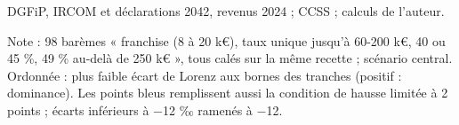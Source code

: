 DGFiP, IRCOM et déclarations 2042, revenus 2024 ; CCSS ; calculs de l'auteur.\par Note : 98 barèmes « franchise (8 à 20 k\euro{}), taux unique jusqu'à 60-200 k\euro{}, 40 ou 45 \%, 49 \% au-delà de 250 k\euro{} », tous calés sur la même recette ; scénario central. Ordonnée : plus faible écart de Lorenz aux bornes des tranches (positif : dominance). Les points bleus remplissent aussi la condition de hausse limitée à 2 points ; écarts inférieurs à $-$12 ‰ ramenés à $-$12.
